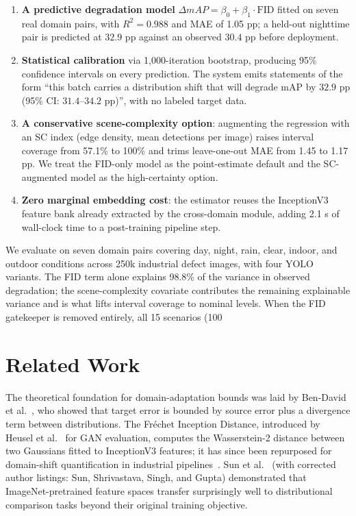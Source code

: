 \documentclass[10pt,twocolumn,letterpaper]{article}
\begin{document}
\begin{enumerate}
    \item \textbf{A predictive degradation model} $\Delta mAP = \beta_0 + \beta_1 \cdot \text{FID}$ fitted on seven real domain pairs, with $R^2 = 0.988$ and MAE of 1.05 pp; a held-out nighttime pair is predicted at $32.9$ pp against an observed $30.4$ pp before deployment.
    \item \textbf{Statistical calibration} via 1,000-iteration bootstrap, producing 95\% confidence intervals on every prediction. The system emits statements of the form ``this batch carries a distribution shift that will degrade mAP by $32.9$ pp (95\% CI: $31.4$--$34.2$ pp)'', with no labeled target data.

    \item \textbf{A conservative scene-complexity option}: augmenting the regression with an SC index (edge density, mean detections per image) raises interval coverage from 57.1\% to 100\% and trims leave-one-out MAE from 1.45 to 1.17 pp. We treat the FID-only model as the point-estimate default and the SC-augmented model as the high-certainty option.
    \item \textbf{Zero marginal embedding cost}: the estimator reuses the InceptionV3 feature bank already extracted by the cross-domain module, adding 2.1 s of wall-clock time to a post-training pipeline step.
\end{enumerate}

We evaluate on seven domain pairs covering day, night, rain, clear, indoor, and outdoor conditions across 250k industrial defect images, with four YOLO variants. The FID term alone explains 98.8\% of the variance in observed degradation; the scene-complexity covariate contributes the remaining explainable variance and is what lifts interval coverage to nominal levels. When the FID gatekeeper is removed entirely, all 15 scenarios (100%

\section{Related Work}
The theoretical foundation for domain-adaptation bounds was laid by Ben-David et al.~\cite{bendavid2010theory}, who showed that target error is bounded by source error plus a divergence term between distributions. The Fr\'echet Inception Distance, introduced by Heusel et al.~\cite{heusel2017gans} for GAN evaluation, computes the Wasserstein-2 distance between two Gaussians fitted to InceptionV3 features; it has since been repurposed for domain-shift quantification in industrial pipelines~\cite{wyoloservice2,invoker2026}. Sun et al.~\cite{sun2017revisiting} (with corrected author listings: Sun, Shrivastava, Singh, and Gupta) demonstrated that ImageNet-pretrained feature spaces transfer surprisingly well to distributional comparison tasks beyond their original training objective.
\end{document}
